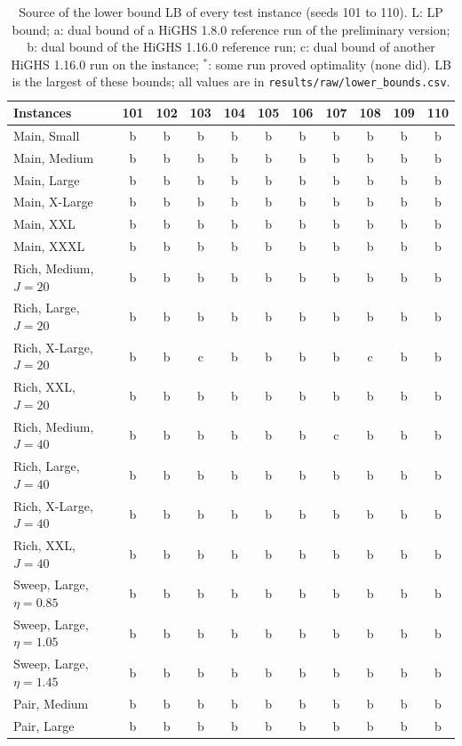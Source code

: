 \begin{table}[pos=H]
\centering
\caption{Source of the lower bound LB of every test instance (seeds 101 to 110). L: LP bound; a: dual bound of a HiGHS 1.8.0 reference run of the preliminary version; b: dual bound of the HiGHS 1.16.0 reference run; c: dual bound of another HiGHS 1.16.0 run on the instance; $^{*}$: some run proved optimality (none did). LB is the largest of these bounds; all values are in \texttt{results/raw/lower\_bounds.csv}.}
\label{tab:lb}
\scriptsize
\begin{tabular}{@{}lcccccccccc@{}}
\toprule
Instances & 101 & 102 & 103 & 104 & 105 & 106 & 107 & 108 & 109 & 110 \\
\midrule
Main, Small & b & b & b & b & b & b & b & b & b & b \\
Main, Medium & b & b & b & b & b & b & b & b & b & b \\
Main, Large & b & b & b & b & b & b & b & b & b & b \\
Main, X-Large & b & b & b & b & b & b & b & b & b & b \\
Main, XXL & b & b & b & b & b & b & b & b & b & b \\
Main, XXXL & b & b & b & b & b & b & b & b & b & b \\
Rich, Medium, $J = 20$ & b & b & b & b & b & b & b & b & b & b \\
Rich, Large, $J = 20$ & b & b & b & b & b & b & b & b & b & b \\
Rich, X-Large, $J = 20$ & b & b & c & b & b & b & b & c & b & b \\
Rich, XXL, $J = 20$ & b & b & b & b & b & b & b & b & b & b \\
Rich, Medium, $J = 40$ & b & b & b & b & b & b & c & b & b & b \\
Rich, Large, $J = 40$ & b & b & b & b & b & b & b & b & b & b \\
Rich, X-Large, $J = 40$ & b & b & b & b & b & b & b & b & b & b \\
Rich, XXL, $J = 40$ & b & b & b & b & b & b & b & b & b & b \\
Sweep, Large, $\eta = 0.85$ & b & b & b & b & b & b & b & b & b & b \\
Sweep, Large, $\eta = 1.05$ & b & b & b & b & b & b & b & b & b & b \\
Sweep, Large, $\eta = 1.45$ & b & b & b & b & b & b & b & b & b & b \\
Pair, Medium & b & b & b & b & b & b & b & b & b & b \\
Pair, Large & b & b & b & b & b & b & b & b & b & b \\
\bottomrule
\end{tabular}
\end{table}
